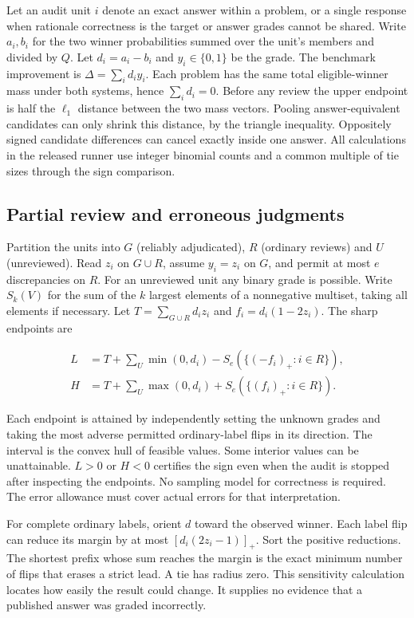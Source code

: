 \documentclass[10pt,letterpaper]{article}
\newcommand{\D}{\Delta}
\begin{document}
Let an audit unit $i$ denote an exact answer within a problem, or a single response when rationale correctness is the target or answer grades cannot be shared. Write $a_i,b_i$ for the two winner probabilities summed over the unit's members and divided by $Q$. Let $d_i=a_i-b_i$ and $y_i\in\{0,1\}$ be the grade. The benchmark improvement is $\D=\sum_i d_i y_i$. Each problem has the same total eligible-winner mass under both systems, hence $\sum_i d_i=0$. Before any review the upper endpoint is half the $\ell_1$ distance between the two mass vectors. Pooling answer-equivalent candidates can only shrink this distance, by the triangle inequality. Oppositely signed candidate differences can cancel exactly inside one answer. All calculations in the released runner use integer binomial counts and a common multiple of tie sizes through the sign comparison.

\subsection*{Partial review and erroneous judgments}
Partition the units into $G$ (reliably adjudicated), $R$ (ordinary reviews) and $U$ (unreviewed). Read $z_i$ on $G\cup R$, assume $y_i=z_i$ on $G$, and permit at most $e$ discrepancies on $R$. For an unreviewed unit any binary grade is possible. Write $S_k(V)$ for the sum of the $k$ largest elements of a nonnegative multiset, taking all elements if necessary. Let $T=\sum_{G\cup R} d_i z_i$ and $f_i=d_i(1-2z_i)$. The sharp endpoints are
\begin{linenomath}
\begin{align*}
 L &= T+\sum_{U}\min(0,d_i)-S_e(\{(-f_i)_+:i\in R\}),\\
 H &= T+\sum_{U}\max(0,d_i)+S_e(\{(f_i)_+:i\in R\}).
\end{align*}
\end{linenomath}
Each endpoint is attained by independently setting the unknown grades and taking the most adverse permitted ordinary-label flips in its direction. The interval is the convex hull of feasible values. Some interior values can be unattainable. $L>0$ or $H<0$ certifies the sign even when the audit is stopped after inspecting the endpoints. No sampling model for correctness is required. The error allowance must cover actual errors for that interpretation.

For complete ordinary labels, orient $d$ toward the observed winner. Each label flip can reduce its margin by at most $[d_i(2z_i-1)]_+$. Sort the positive reductions. The shortest prefix whose sum reaches the margin is the exact minimum number of flips that erases a strict lead. A tie has radius zero. This sensitivity calculation locates how easily the result could change. It supplies no evidence that a published answer was graded incorrectly.
\end{document}
